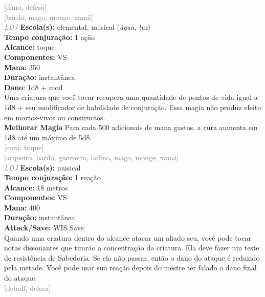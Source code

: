 \documentclass{RPG_Adventure}[2021/10/20]
\begin{document}
{\scriptsize \textcolor{gray}{[dano, defesa]\\}}
{\scriptsize \textcolor{gray}{[bardo, mago, monge, xamã]\\}}
{\tiny \textcolor{gray}{\textit{LDJ}}}\jump{}
{\small \t \textbf{Escola(s):} elemental, musical (\textit{água, luz})\\\t \textbf{Tempo conjuração:} 1 ação\\\t \textbf{Alcance:} toque\\\t \textbf{Componentes:} VS\\\t \textbf{Mana:} 350\\\t \textbf{Duração:} instantânea\\\t \textbf{Dano}: 1d8 + mod\\}
{\normalsize Uma criatura que você tocar recupera uma quantidade de pontos de vida igual a 1d8 + seu modificador de habilidade de conjuração. Essa magia não produz efeito em mortos-vivos ou constructos.\\\t \textbf{Melhorar Magia} Para cada 500 adicionais de mana gastos, a cura aumenta em 1d8 até um máximo de 5d8.\\}
{\scriptsize \textcolor{gray}{[cura, toque]\\}}
{\scriptsize \textcolor{gray}{[arqueiro, bardo, guerreiro, ladino, mago, monge, xamã]\\}}
{\tiny \textcolor{gray}{\textit{LDJ}}}\jump{}
{\small \t \textbf{Escola(s):} musical\\\t \textbf{Tempo conjuração:} 1 reação\\\t \textbf{Alcance:} 18 metros\\\t \textbf{Componentes:} VS\\\t \textbf{Mana:} 400\\\t \textbf{Duração:} instantânea\\\t \textbf{Attack/Save:} WIS Save\\}
{\normalsize Quando uma criatura dentro do alcance atacar um aliado seu, você pode tocar notas dissonantes que tirarão a concentração da criatura. Ela deve fazer um teste de resistência de Sabedoria. Se ela não passar, então o dano do ataque é reduzido pela metade. Você pode usar sua reação depois do mestre ter falado o dano final do ataque.\\}
{\scriptsize \textcolor{gray}{[debuff, defesa]\\}}
\end{document}

